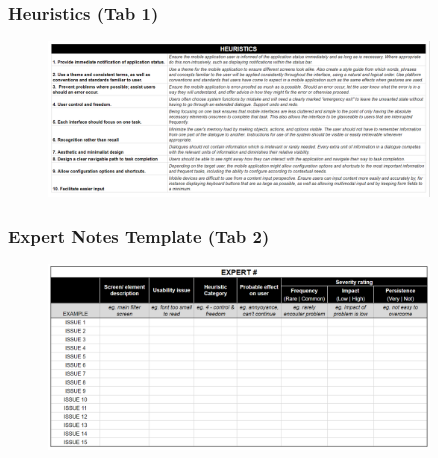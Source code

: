 \documentclass[a4 paper, 12pt]{article}
\begin{document}
    \subsubsection*{Heuristics (Tab 1)}
    \begin{figure} [H]
        \centering
        \includegraphics[width=0.9\textwidth, frame]
            {./High_Fidelity/High_Heuristics.PNG}
    \end{figure}

    \subsubsection*{Expert Notes Template (Tab 2)}

    \begin{figure} [H]
        \centering
        \includegraphics[width=0.9\textwidth, frame]
            {./High_Fidelity/High_Expert_Template.PNG}
    \end{figure}

    \pagebreak     
    
                \label{sec:C.5}
\end{document}
